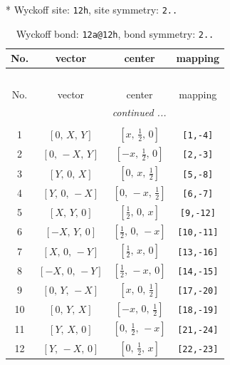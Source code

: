\documentclass[fleqn,8pt]{jsarticle}
\begin{document}
* Wyckoff site: {\tt 12h}, site symmetry: {\tt 2..}
\renewcommand{\arraystretch}{1.2}
\begin{longtable}{cccc}
\caption{Wyckoff bond: {\tt 12a@12h}, bond symmetry: {\tt 2..}}
 \\
 \hline \hline
No. & vector & center & mapping \\ \hline \endfirsthead

\multicolumn{3}{l}{\tablename\ \thetable{}} \\
 \hline \hline
No. & vector & center & mapping \\ \hline \endhead

 \hline \hline
\multicolumn{3}{r}{\footnotesize\it continued ...} \\ \endfoot

 \hline \hline
\multicolumn{3}{r}{} \\ \endlastfoot

1 & $\left[ 0,\, X,\, Y \right]$ & $\left[ x,\, \frac{1}{2},\, 0 \right]$ & {\tt [1,-4]} \\ \hline
2 & $\left[ 0,\, - X,\, Y \right]$ & $\left[ - x,\, \frac{1}{2},\, 0 \right]$ & {\tt [2,-3]} \\ \hline
3 & $\left[ Y,\, 0,\, X \right]$ & $\left[ 0,\, x,\, \frac{1}{2} \right]$ & {\tt [5,-8]} \\ \hline
4 & $\left[ Y,\, 0,\, - X \right]$ & $\left[ 0,\, - x,\, \frac{1}{2} \right]$ & {\tt [6,-7]} \\ \hline
5 & $\left[ X,\, Y,\, 0 \right]$ & $\left[ \frac{1}{2},\, 0,\, x \right]$ & {\tt [9,-12]} \\ \hline
6 & $\left[ - X,\, Y,\, 0 \right]$ & $\left[ \frac{1}{2},\, 0,\, - x \right]$ & {\tt [10,-11]} \\ \hline
7 & $\left[ X,\, 0,\, - Y \right]$ & $\left[ \frac{1}{2},\, x,\, 0 \right]$ & {\tt [13,-16]} \\ \hline
8 & $\left[ - X,\, 0,\, - Y \right]$ & $\left[ \frac{1}{2},\, - x,\, 0 \right]$ & {\tt [14,-15]} \\ \hline
9 & $\left[ 0,\, Y,\, - X \right]$ & $\left[ x,\, 0,\, \frac{1}{2} \right]$ & {\tt [17,-20]} \\ \hline
10 & $\left[ 0,\, Y,\, X \right]$ & $\left[ - x,\, 0,\, \frac{1}{2} \right]$ & {\tt [18,-19]} \\ \hline
11 & $\left[ Y,\, X,\, 0 \right]$ & $\left[ 0,\, \frac{1}{2},\, - x \right]$ & {\tt [21,-24]} \\ \hline
12 & $\left[ Y,\, - X,\, 0 \right]$ & $\left[ 0,\, \frac{1}{2},\, x \right]$ & {\tt [22,-23]} \\
\end{longtable}
\end{document}
